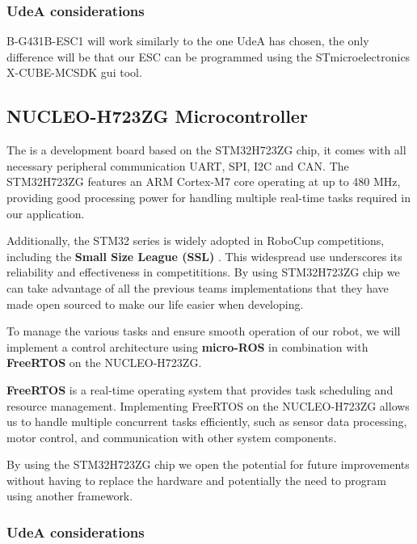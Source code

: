 \documentclass[a4paper,8pt]{article}
\begin{document}
  \subsubsection{UdeA considerations}

  B-G431B-ESC1 will work similarly to the one UdeA has chosen, the only difference will be that our ESC can be programmed using the STmicroelectronics X-CUBE-MCSDK gui tool.

  \subsection{NUCLEO-H723ZG Microcontroller}

  The  is a development board based on the
  STM32H723ZG chip, it comes with all necessary peripheral communication
  UART, SPI, I2C and CAN. The STM32H723ZG features an ARM Cortex-M7 core
  operating at up to 480 MHz, providing good processing power for
  handling multiple real-time tasks required in our application.

  Additionally, the STM32 series is widely adopted in RoboCup
  competitions, including the \textbf{Small Size League (SSL)} \cite{ryllExtendedTeamDescription}\cite{zhaoZJUNlictExtendedTeam}\cite{wuCompilationErrorTeam}.
  This widespread use underscores its reliability and effectiveness in
  competititions. By using STM32H723ZG chip we can take advantage of all the previous teams implementations that they have made open sourced to make our life easier when developing.

  To manage the various tasks and ensure smooth operation of our robot,
  we will implement a control architecture using \textbf{micro-ROS} in
  combination with \textbf{FreeRTOS} on the NUCLEO-H723ZG.

  \textbf{FreeRTOS} is a real-time operating system that provides task
  scheduling and resource management. Implementing FreeRTOS on the
  NUCLEO-H723ZG allows us to handle multiple concurrent tasks
  efficiently, such as sensor data processing, motor control, and
  communication with other system components.

  By using the STM32H723ZG chip we open the potential for future improvements without having to replace the hardware and potentially the need to program using another framework.

  \subsubsection{UdeA considerations}
\end{document}
